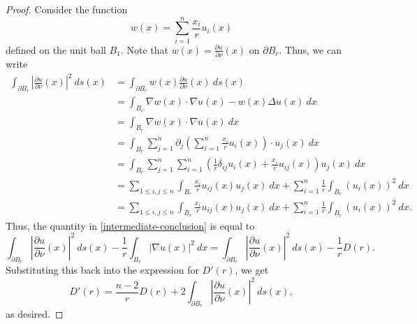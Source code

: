 \documentclass[10pt]{amsart}
\theoremstyle{thmstyle}
\theoremstyle{defstyle}
\renewcommand{\le}{\leqslant}
\begin{document}
\begin{proof}
Consider the function 
\begin{equation*}
    w(x) = \sum_{i = 1}^n\frac{x_i}{r}u_i(x)
\end{equation*}
defined on the unit ball $B_1$. Note that $w(x) = \frac{\partial u}{\partial\nu}(x)$ on $\partial B_r$. Thus, we can write 
\begin{align*}
    \int_{\partial B_r}\left|\frac{\partial u}{\partial\nu}(x)\right|^2~ds(x) &= \int_{\partial B_r} w(x)\frac{\partial u}{\partial\nu}(x)~ds(x)\\ 
    &= \int_{B_r}\nabla w(x)\cdot\nabla u(x) - w(x)\Delta u(x)~dx\\ 
    &= \int_{B_r}\nabla w(x)\cdot\nabla u(x)~dx\\
    &= \int_{B_r}\sum_{j = 1}^n\partial_j\left(\sum_{i = 1}^n \frac{x_i}{r}u_i(x)\right)\cdot u_j(x)~dx\\
    &= \int_{B_r}\sum_{j = 1}^n\sum_{i = 1}^n\left(\frac{1}{r}\delta_{ij}u_i(x) + \frac{x_i}{r}u_{ij}(x)\right)u_j(x)~dx\\
    &= \sum_{1\le i,j\le n}\int_{B_r}\frac{x_i}{r}u_{ij}(x)u_j(x)~dx + \sum_{i = 1}^n\frac{1}{r}\int_{B_r}\left(u_i(x)\right)^2~dx\\
    &= \sum_{1\le i,j\le n}\int_{B_r}\frac{x_i}{r}u_{ij}(x)u_j(x)~dx + \sum_{i = 1}^n\frac{1}{r}\int_{B_r}(u_i(x))^2~dx.
\end{align*}
Thus, the quantity in \eqref{intermediate-conclusion} is equal to 
\begin{equation*}
    \int_{\partial B_r}\left|\frac{\partial u}{\partial\nu}(x)\right|^2~ds(x) - \frac{1}{r}\int_{B_r}|\nabla u(x)|^2~dx = \int_{\partial B_r}\left|\frac{\partial u}{\partial\nu}(x)\right|^2~ds(x) - \frac{1}{r}D(r).
\end{equation*}
Substituting this back into the expression for $D'(r)$, we get 
\begin{equation*}
    D'(r) = \frac{n - 2}{r}D(r) + 2\int_{\partial B_r}\left|\frac{\partial u}{\partial\nu}(x)\right|^2~ds(x),
\end{equation*}
as desired.
\end{proof}
\end{document}
